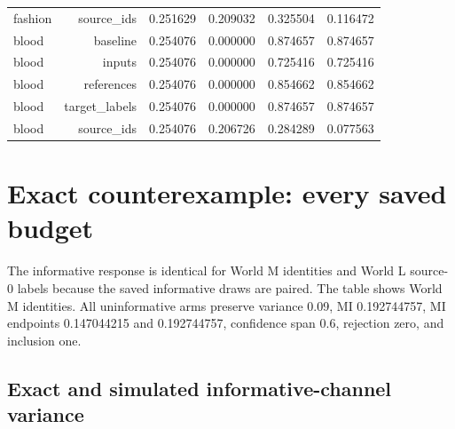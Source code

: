 \begin{longtable}{lrrrrr}
fashion & source\_ids & 0.251629 & 0.209032 & 0.325504 & 0.116472\\

blood & baseline & 0.254076 & 0.000000 & 0.874657 & 0.874657\\

blood & inputs & 0.254076 & 0.000000 & 0.725416 & 0.725416\\

blood & references & 0.254076 & 0.000000 & 0.854662 & 0.854662\\

blood & target\_labels & 0.254076 & 0.000000 & 0.874657 & 0.874657\\

blood & source\_ids & 0.254076 & 0.206726 & 0.284289 & 0.077563\\

\bottomrule
\end{longtable}
\endgroup

\reservetable
\section{Exact counterexample: every saved budget}

The informative response is identical for World M identities and World L source-0 labels because the saved informative draws are paired. The table shows World M identities. All uninformative arms preserve variance 0.09, MI 0.192744757, MI endpoints 0.147044215 and 0.192744757, confidence span 0.6, rejection zero, and inclusion one.

\reservetable
\subsection{Exact and simulated informative-channel variance}

